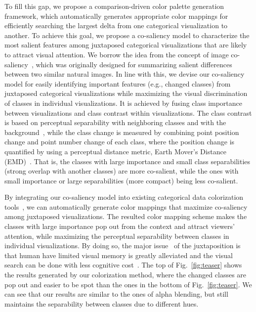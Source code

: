 To fill this gap, we propose a comparison-driven color palette generation framework, which automatically generates appropriate color mappings for efficiently searching the largest delta from one categorical visualization to another.
To achieve this goal, we propose a co-saliency model to characterize the most salient features among juxtaposed categorical visualizations that are likely to attract visual attention. We borrow the idea from the concept of image co-saliency~\cite{Jacobs10}, which was originally designed for summarizing salient differences between two similar natural images. %
In line with this, we devise our co-saliency model for easily identifying important features (e.g., changed classes) from juxtaposed categorical visualizations while maximizing the visual discrimination of classes in individual visualizations. It is achieved by fusing class importance between visualizations and class contrast within visualizations. The class contrast is based on perceptual separability with neighboring classes and with the background~\cite{Wang2018}, while
the class change is measured by combining point position change and point number change of each class, where the position change is quantified by using a perceptual distance metric,  Earth Mover's Distance (EMD)~\cite{rubner2000earth}.
That is, the classes with large importance and small class separabilities (strong overlap with another classes) are more co-salient, while the ones with small importance or large separabilities (more compact) being less co-salient.

By integrating our co-saliency model into existing categorical data colorization tools~\cite{Lu21}, we can automatically generate color mappings that maximize co-saliency among juxtaposed visualizations. The resulted color mapping scheme makes the classes with large importance pop out from the context and attract viewers' attention,  while maximizing the perceptual separability between classes in individual visualizations. By doing so,
the major issue~\cite{Tominski12} of the juxtaposition is that human have limited visual memory is greatly alleviated and the visual search can be done with less cognitive cost~\cite{healey1995visualizing}. The top of Fig.~\ref{fig:teaser} shows the results generated by our colorization method, where the changed classes are pop out and easier to be spot than the ones in the bottom of Fig.~\ref{fig:teaser}. We can see that our results are similar to the ones of alpha blending, but still maintains the separability between classes due to different hues.

